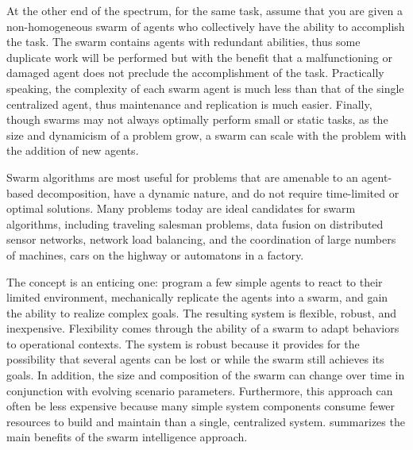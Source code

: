 At the other end of the spectrum, for the same task, assume that you are given a non-homogeneous swarm of agents who collectively have the ability to accomplish the task.  The swarm contains agents with redundant abilities, thus some duplicate work will be performed but with the benefit that a malfunctioning or damaged agent does not preclude the accomplishment of the task.  Practically speaking, the complexity of each swarm agent is much less than that of the single centralized agent, thus maintenance and replication is much easier.  Finally, though swarms may not always optimally perform small or static tasks, as the size and dynamicism of a problem grow, a swarm can scale with the problem with the addition of new agents.

Swarm algorithms are most useful for problems that are amenable to an agent-based decomposition, have a dynamic nature, and do not require time-limited or optimal solutions.  Many problems today are ideal candidates for swarm algorithms, including traveling salesman problems, data fusion on distributed sensor networks, network load balancing, and the coordination of large numbers of machines, \eg{} cars on the highway or automatons in a factory.

The concept is an enticing one: program a few simple agents to react to their limited environment, mechanically replicate the agents into a swarm, and gain the ability to realize complex goals. The resulting system is flexible, robust, and inexpensive. Flexibility comes through the ability of a swarm to adapt behaviors to operational contexts. The system is robust because it provides for the possibility that several agents can be lost or  while the swarm still achieves its goals. In addition, the size and composition of the swarm can change over time in conjunction with evolving scenario parameters. Furthermore, this approach can often be less expensive because many simple system components consume fewer resources to build and maintain than a single, centralized system.  summarizes the main benefits of the swarm intelligence approach.

